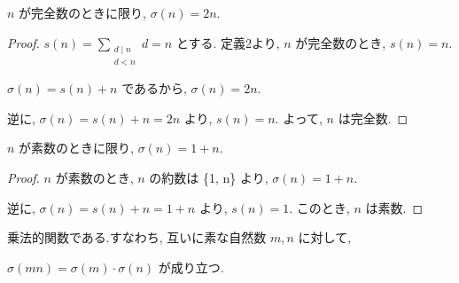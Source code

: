 \begin{lemma}\label{perfect_iff_sum_divisors_eq_two_mul}
\leanok{}

\(n\) が完全数のときに限り, \(\sigma(n) = 2n\).

\end{lemma}

\begin{proof}
\(s(n) = \sum_{\substack{d \mid n\\ d < n}} d = n\) とする.
定義2より, \(n\) が完全数のとき, \(s(n) = n\).

\(\sigma(n) = s(n) + n\) であるから, \(\sigma(n) = 2n\).

逆に, \(\sigma(n) = s(n) + n = 2n\) より, \(s(n) = n\).
よって, \(n\) は完全数.
\end{proof}

\begin{lemma}\label{prime_iff_sum_divisors_eq_succ}\leanok

\(n\) が素数のときに限り, \(\sigma(n) =  1 + n\).

\end{lemma}

\begin{proof}
\(n\) が素数のとき, \(n\) の約数は \{1, n\} より, \(\sigma(n) = 1 + n\).

逆に, \(\sigma(n) = s(n) + n = 1 + n\) より, \(s(n) = 1\).
このとき, \(n\) は素数.
\end{proof}

\begin{lemma}\label{isMultiplicative}

\leanok
乗法的関数である.すなわち, 互いに素な自然数 \(m, n\) に対して,

\(\sigma(mn) = \sigma(m) \cdot \sigma(n)\) が成り立つ.

\end{lemma}

